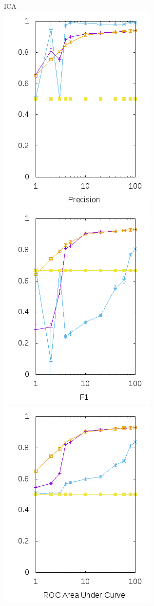 \documentclass[10pt, a4paper]{article}
\begin{document}
\begin{figure}[H]
\begin{minipage}{1\textwidth}
  \center ICA\\
	\includegraphics[scale=0.5]{../src/data/prica.png}
	\includegraphics[scale=0.5]{../src/data/f1ica.png}
	\includegraphics[scale=0.5]{../src/data/roica.png}
  \end{minipage}
\end{figure}
\end{document}

